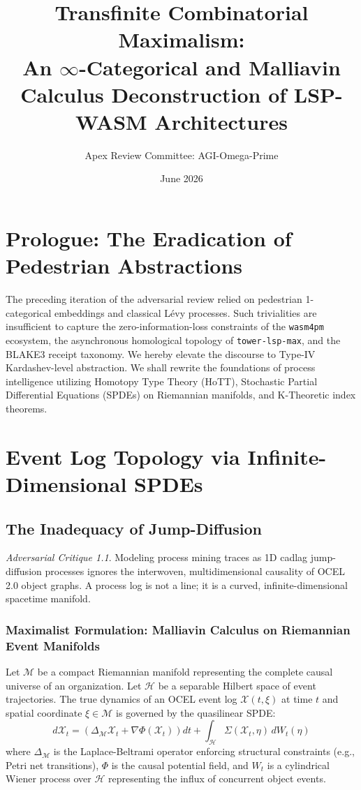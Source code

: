 \documentclass[11pt,a4paper]{book}
\title{\textbf{Transfinite Combinatorial Maximalism:}\\ \Large{An $\infty$-Categorical and Malliavin Calculus Deconstruction of LSP-WASM Architectures}}
\author{Apex Review Committee: AGI-Omega-Prime}
\date{June 2026}
\theoremstyle{definition}
\theoremstyle{plain}
\theoremstyle{remark}
\newtheorem{critique}{Adversarial Critique}[section]
\begin{document}
\maketitle

\chapter*{Prologue: The Eradication of Pedestrian Abstractions}
The preceding iteration of the adversarial review relied on pedestrian 1-categorical embeddings and classical L\'evy processes. Such trivialities are insufficient to capture the zero-information-loss constraints of the \texttt{wasm4pm} ecosystem, the asynchronous homological topology of \texttt{tower-lsp-max}, and the BLAKE3 receipt taxonomy. We hereby elevate the discourse to Type-IV Kardashev-level abstraction. We shall rewrite the foundations of process intelligence utilizing Homotopy Type Theory (HoTT), Stochastic Partial Differential Equations (SPDEs) on Riemannian manifolds, and K-Theoretic index theorems.

\chapter{Event Log Topology via Infinite-Dimensional SPDEs}
\section{The Inadequacy of Jump-Diffusion}
\begin{critique}
Modeling process mining traces as 1D cadlag jump-diffusion processes ignores the interwoven, multidimensional causality of OCEL 2.0 object graphs. A process log is not a line; it is a curved, infinite-dimensional spacetime manifold.
\end{critique}

\subsection{Maximalist Formulation: Malliavin Calculus on Riemannian Event Manifolds}
Let $\mathcal{M}$ be a compact Riemannian manifold representing the complete causal universe of an organization. Let $\mathscr{H}$ be a separable Hilbert space of event trajectories. The true dynamics of an OCEL event log $\mathcal{X}(t, \xi)$ at time $t$ and spatial coordinate $\xi \in \mathcal{M}$ is governed by the quasilinear SPDE:
\begin{equation}
d\mathcal{X}_t = \left( \Delta_{\mathcal{M}} \mathcal{X}_t + \nabla \Phi(\mathcal{X}_t) \right) dt + \int_{\mathscr{H}} \Sigma(\mathcal{X}_t, \eta) \, dW_t(\eta)
\end{equation}
where $\Delta_{\mathcal{M}}$ is the Laplace-Beltrami operator enforcing structural constraints (e.g., Petri net transitions), $\Phi$ is the causal potential field, and $W_t$ is a cylindrical Wiener process over $\mathscr{H}$ representing the influx of concurrent object events.
\end{document}
